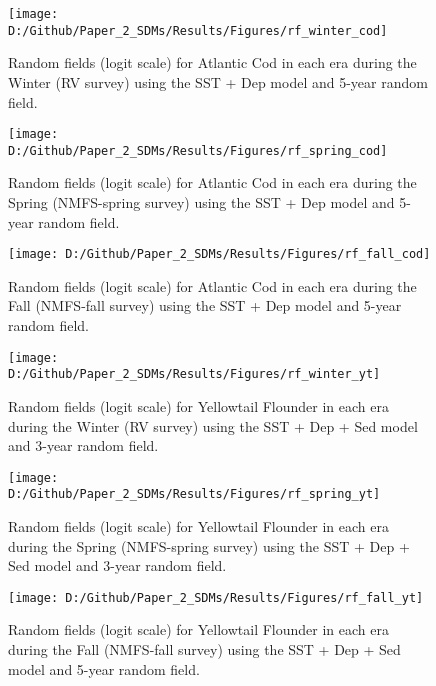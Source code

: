 \documentclass[
]{article}
\begin{document}
\begin{landscape}
\begin{figure}
\texttt{[image: D:/Github/Paper\_2\_SDMs/Results/Figures/rf\_winter\_cod]} \caption{Random fields (logit scale) for Atlantic Cod  in each era during the Winter (RV survey) using the SST + Dep model and 5-year random field.}\label{fig:rf-winter-cod}
\end{figure}

\newpage
\begin{figure}
\texttt{[image: D:/Github/Paper\_2\_SDMs/Results/Figures/rf\_spring\_cod]} \caption{Random fields (logit scale) for Atlantic Cod  in each era during the Spring (NMFS-spring survey) using the SST + Dep model and 5-year random field.}\label{fig:rf-spring-cod}
\end{figure}

\newpage
\begin{figure}
\texttt{[image: D:/Github/Paper\_2\_SDMs/Results/Figures/rf\_fall\_cod]} \caption{Random fields (logit scale) for Atlantic Cod  in each era during the Fall (NMFS-fall survey) using the SST + Dep model and 5-year random field.}\label{fig:rf-fall-cod}
\end{figure}

\newpage
\begin{figure}
\texttt{[image: D:/Github/Paper\_2\_SDMs/Results/Figures/rf\_winter\_yt]} \caption{Random fields (logit scale) for Yellowtail Flounder in each era during the Winter (RV survey) using the SST + Dep + Sed model and 3-year random field.}\label{fig:rf-winter-yt}
\end{figure}

\newpage
\begin{figure}
\texttt{[image: D:/Github/Paper\_2\_SDMs/Results/Figures/rf\_spring\_yt]} \caption{Random fields (logit scale) for Yellowtail Flounder in each era during the Spring (NMFS-spring survey) using the SST + Dep + Sed model and 3-year random field.}\label{fig:rf-spring-yt}
\end{figure}

\newpage
\begin{figure}
\texttt{[image: D:/Github/Paper\_2\_SDMs/Results/Figures/rf\_fall\_yt]} \caption{Random fields (logit scale) for Yellowtail Flounder in each era during the Fall (NMFS-fall survey) using the SST + Dep + Sed model and 5-year random field.}\label{fig:rf-fall-yt}
\end{figure}


\end{landscape}
\end{document}
